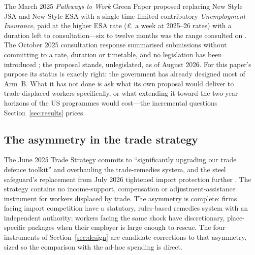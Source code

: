 The March 2025 \emph{Pathways to Work} Green Paper proposed replacing New
Style JSA and New Style ESA with a single time-limited contributory
\emph{Unemployment Insurance}, paid at the higher ESA rate
(\pounds\InstUIWeeklyRate\ a week at 2025--26 rates) with a duration
left to consultation---six to twelve months was the range
consulted on \citep{dwp2025pathways}. The October 2025 consultation
response summarised submissions without committing to a rate, duration
or timetable, and no legislation has been introduced
\citep{dwp2025response}; the proposal stands, unlegislated, as of August
2026. For this paper's purpose its status is exactly right: the
government has already designed most of Arm~B. What it has not done is
ask what its own proposal would deliver to trade-displaced workers
specifically, or what extending it toward the two-year horizons of the US
programmes would cost---the incremental questions
Section~\ref{sec:results} prices.

\subsection{The asymmetry in the trade strategy}

The June 2025 Trade Strategy commits to ``significantly upgrading our
trade defence toolkit'' and overhauling the trade-remedies system, and
the steel safeguard's replacement from July 2026 tightened import
protection further \citep{dbt2025strategy}. The strategy contains no
income-support, compensation or adjustment-assistance instrument for
workers displaced by trade. The asymmetry is complete: firms facing
import competition have a statutory, rules-based remedies system with an
independent authority; workers facing the same shock have discretionary,
place-specific packages when their employer is large enough to rescue.
The four instruments of Section~\ref{sec:design} are candidate
corrections to that asymmetry, sized so the comparison with the ad-hoc
spending is direct.
